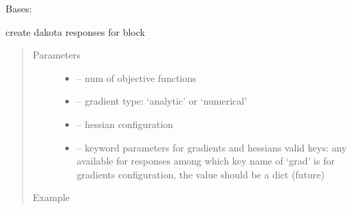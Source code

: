 \documentclass[letterpaper,10pt,english]{sphinxmanual}
\begin{document}

\begin{fulllineitems}
\label{\detokenize{src/apidocs/genopt:genopt.DakotaResponses}}
Bases: \href{https://docs.python.org/2/library/functions.html\#object}{}

create dakota responses for  block
\begin{quote}\begin{description}
\item[{Parameters}] \leavevmode\begin{itemize}
\item {} 
 -- num of objective functions

\item {} 
 -- gradient type: `analytic' or `numerical'

\item {} 
 -- hessian configuration

\item {} 
 -- keyword parameters for gradients and hessians
valid keys: any available for responses
among which key name of `grad' is for gradients configuration, 
the value should be a dict (future)

\end{itemize}

\item[{Example}] \leavevmode
\end{description}\end{quote}


\end{fulllineitems}
\end{document}
